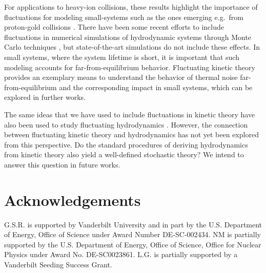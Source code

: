 \documentclass[aps,prd,preprint,nofootinbib,amsmath,amssymb,showpacs,longbibliography,singlecolumn,superscriptaddress,10pt]{revtex4-1}
\theoremstyle{plain}
\theoremstyle{definition}
\begin{document}
For applications to heavy-ion collisions, these results highlight the importance of fluctuations for modeling small-systems such as the ones emerging e.g.~from proton-gold collisions \cite{Noronha:2024dtq}. There have been some recent efforts to include fluctuations in numerical simulations of hydrodynamic systems through 
Monte Carlo techniques \cite{Florio:2021jlx, Florio:2023kmy, Chattopadhyay:2023jfm, Basar:2024qxd}, but state-of-the-art simulations do not include these effects. In small systems, where the system lifetime is short, it is important that such modeling accounts for far-from-equilibrium behavior. Fluctuating kinetic theory provides an exemplary means to understand the behavior of thermal noise far-from-equilibrium and the corresponding impact in small systems, which can be explored in further works.

The same ideas that we have used to include fluctuations in kinetic theory have also been used to study fluctuating hydrodynamics \cite{Mullins:2023tjg, Mullins:2023ott, Gavassino:2024vyu}. However, the connection between fluctuating kinetic theory and hydrodynamics has not yet been explored from this perspective. Do the standard procedures of deriving hydrodynamics from kinetic theory also yield a well-defined stochastic theory? We intend to answer this question in future works. 




\section*{Acknowledgements}

G.S.R. is supported by Vanderbilt University and in part by the U.S. Department of Energy, Office of Science under Award Number DE-SC-002434. NM is partially supported by the U.S. Department of Energy, Office of Science, Office for Nuclear Physics under Award No. DE-SC0023861. L.G. is partially supported by a Vanderbilt Seeding Success Grant.



\appendix



\end{document}
